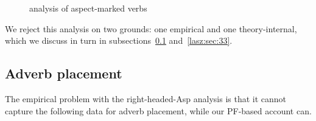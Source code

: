 \documentclass[output=paper,colorlinks,citecolor=brown,
]{langscibook}
\begin{document}
\begin{figure}
    \centering
    \caption{ analysis of aspect-marked verbs}
    \label{lasz:fig:2}
\end{figure}

We reject this analysis on two grounds: one empirical and one
theory-internal, which we discuss in turn in subsections~\ref{lasz:sec:32} and~\ref{lasz:sec:33}.

\subsection{Adverb placement}
\label{lasz:sec:32}

The empirical problem with the right-headed-Asp analysis is that it
cannot capture the following data for adverb placement, while our PF-based account can.
\end{document}
